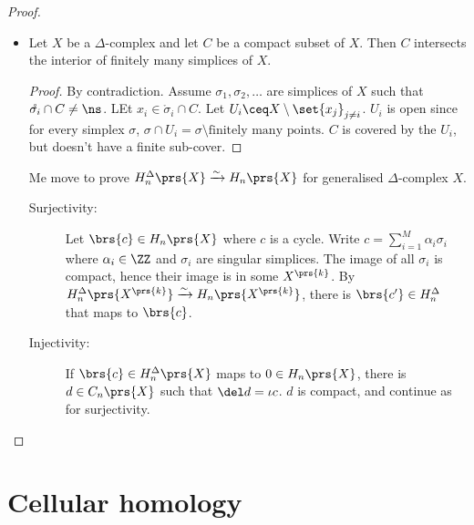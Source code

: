 \documentclass[10pt,a4paper,twoside,openany,hidelinks]{book}
\begin{document}
\begin{proof}
\begin{itemize}
\item
\begin{lemma}
Let $X$ be a $\Delta$-complex and let $C$ be a compact subset of $X$. Then $C$ intersects the interior of finitely many simplices of $X$.
\end{lemma}
\begin{proof}
By contradiction.
Assume $\sigma_1, \sigma_2, \ldots$ are simplices of $X$ such that $\mathring{\sigma_i} \cap C \neq \ns$. LEt $x_i \in \mathring{\sigma}_i \cap C$. Let $U_i \ceq X \setminus \set{x_j}_{j\neq i}$. $U_i$ is open since for every simplex $\sigma$, $\sigma \cap U_i = \sigma \setminus \text{finitely many points}$. $C$ is covered by the $U_i$, but doesn't have a finite sub-cover. 
\end{proof}

Me move to prove $H_n^{\Delta}\prs{X} \xrightarrow{\sim} H_n\prs{X}$ for generalised $\Delta$-complex $X$.
\begin{description}
\item[Surjectivity:]
Let $\brs{c} \in H_n\prs{X}$ where $c$ is a cycle.
Write
$c = \sum_{i=1}^M \alpha_i \sigma_i$ where $\alpha_i \in \ZZ$ and $\sigma_i$ are singular simplices. The image of all $\sigma_i$ is compact, hence their image is in some $X^{\prs{k}}$. By $H_n^{\Delta}\prs{X^{\prs{k}}} \xrightarrow{\sim} H_n\prs{X^{\prs{k}}}$, there is $\brs{c'} \in H_n^{\Delta}$ that maps to $\brs{c}$.
\item[Injectivity:]
If $\brs{c} \in H_n^{\Delta}\prs{X}$ maps to $0 \in H_n\prs{X}$, there is $d \in C_n\prs{X}$ such that $\del d = \iota c$. $d$ is compact, and continue as for surjectivity.
\end{description}
\end{itemize}
\end{proof}
\chapter{Cellular homology}
\end{document}
